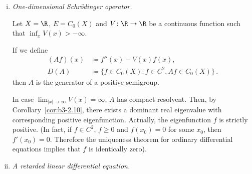 \begin{example}\label{ex:b3-2.14}

\begin{enumerate}[(i), wide]
	\item \emph{One-dimensional Schrödinger operator.}

	Let $X = \R$, $E = C_{0}(X)$ and $V \colon \R \to \R$ be a continuous function such that $\inf_{x} V(x) > -\infty$.
	
	If we define
	\begin{equation}\label{eq:b3-2.22}
		\begin{aligned}
			(Af)(x) &\coloneqq f''(x) - V(x)f(x), \\
			D(A) &\coloneqq \{f \in C_{0}(X) \colon f \in C^{2}, Af \in C_{0}(X)\}\,.
		\end{aligned}
	\end{equation}
	then $A$ is the generator of a positive semigroup.
	
	In case $\lim_{|x| \to \infty}V(x) = \infty$, $A$ has compact resolvent.
	Then, by Corollary~\ref{cor:b3-2.10}, there exists a dominant real eigenvalue with corresponding positive eigenfunction.
	Actually, the eigenfunction $f$ is strictly positive. (In fact, if $f \in C^{2}$, $f \geq 0$ and $f(x_{0}) = 0$ for some $x_{0}$, then $f'(x_{0}) = 0$.
	Therefore the uniqueness theorem for ordinary differential equations implies that $f$ is identically zero).
	
\item \emph{A retarded linear differential equation.} 	


\end{enumerate}
\end{example}
